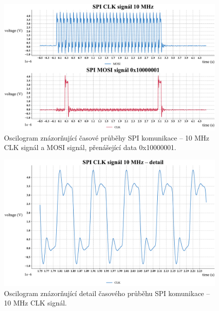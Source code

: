 \documentclass[a4paper, twoside, 11pt]{article}
\begin{document}
	\begin{figure}[htbp!]
		\centering
		\includegraphics[width=1\textwidth]{src/python-graph/spi-osciloscope-data/pdf/clk-data-full-graph.pdf}
		\caption{Oscilogram znázorňující časové průběhy SPI komunikace – 10 MHz CLK signál a MOSI signál, přenášející data 0x10000001.}
		\label{fig:clk-data-full-graph}
	\end{figure}


	\begin{figure}[htbp!]
		\centering
		\includegraphics[width=1\textwidth]{src/python-graph/spi-osciloscope-data/pdf/clk-mid-graph.pdf}
		\caption{Oscilogram znázorňující detail časového průběhu SPI komunikace – 10 MHz CLK signál.}
		\label{fig:clk-mid-graph}
	\end{figure}
\end{document}
